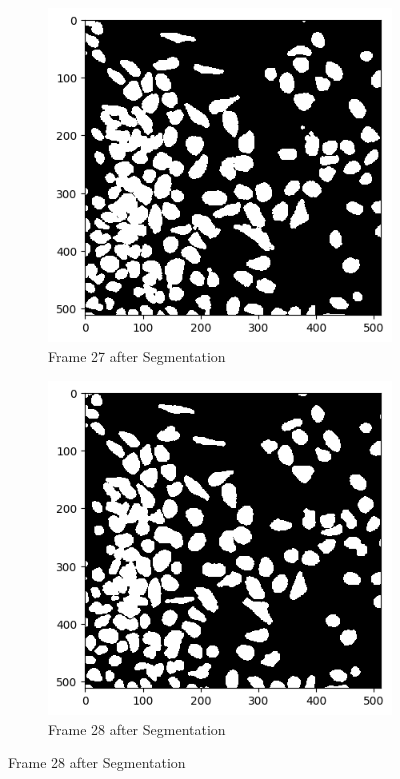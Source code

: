 \documentclass{article}
\begin{document}
\begin{figure}[h!]
  \begin{subfigure}{0.4\textwidth}
    \includegraphics[width=\linewidth]{Report/Appendix_Images/Segmentation-A-Control/frame_27.png}
    \caption*{Frame 27 after Segmentation}
  \end{subfigure}
  \hfill
  \begin{subfigure}{0.4\textwidth}
    \includegraphics[width=\linewidth]{Report/Appendix_Images/Segmentation-A-Control/frame_28.png}
    \caption*{Frame 28 after Segmentation}
  \end{subfigure}


\end{figure}
\end{document}
